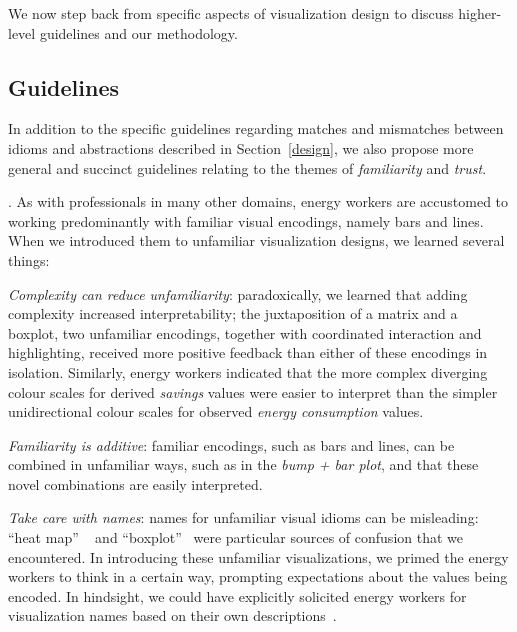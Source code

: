 \documentclass[journal]{vgtc}                %
\newcommand{\bstart}[1]{\vspace{1mm} \noindent{\textbf{#1:}}}
\begin{document}
We now step back from specific aspects of visualization design to discuss higher-level guidelines and our methodology.


\subsection{Guidelines}
\label{discussion-guidelines}


In addition to the specific guidelines regarding matches and mismatches between idioms and abstractions described in Section~\ref{design}, we also propose more general and succinct guidelines relating to the themes of {\it familiarity} and {\it trust}.

\bstart{Familiarity}.
As with professionals in many other domains, energy workers are accustomed to working predominantly with familiar visual encodings, namely bars and lines.
When we introduced them to unfamiliar visualization designs, we learned several things:

{\it Complexity can reduce unfamiliarity}: paradoxically, we learned that adding complexity increased interpretability; the juxtaposition of a matrix and a boxplot, two unfamiliar encodings, together with coordinated interaction and highlighting, received more positive feedback than either of these encodings in isolation.
Similarly, energy workers indicated that the more complex diverging colour scales for derived {\it savings} values were easier to interpret than the simpler unidirectional colour scales for observed {\it energy consumption} values. %

{\it Familiarity is additive}: familiar encodings, such as bars and lines, can be combined in unfamiliar ways, such as in the {\it bump + bar plot}, and that these novel combinations are easily interpreted.

{\it Take care with names}: names for unfamiliar visual idioms can be misleading: ``heat map'' ~\cite{Field2015,Wilkinson2009} and ``boxplot''~\cite{Wickham2011} were particular sources of confusion that we encountered.
In introducing these unfamiliar visualizations, we primed the energy workers to think in a certain way, prompting expectations about the values being encoded. 
In hindsight, we could have explicitly solicited energy workers for visualization names based on their own descriptions~\cite{Metoyer2012}.
\end{document}
